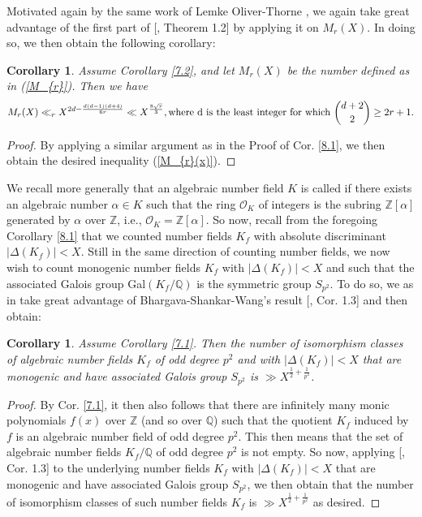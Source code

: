 \documentclass{article}
\theoremstyle{plain}
\newtheorem{cor}[thm]{Corollary}
\theoremstyle{definition}
\begin{document}
Motivated again by the same work of Lemke Oliver-Thorne \cite{lem}, we again take great advantage of the first part of [\cite{lem}, Theorem 1.2] by applying it on $M_{r}(X)$. In doing so, we then obtain the following corollary:

\begin{cor}Assume Corollary \ref{7.2}, and let $M_{r}(X)$ be the number defined as in \textnormal{(\ref{M_{r}})}. Then we have 
\begin{equation}\label{M_{r}(x)}
M_{r}(X)\ll_{r}X^{2d - \frac{d(d-1)(d+4)}{6r}}\ll X^{\frac{8\sqrt{r}}{3}}, \text{where d is the least integer for which } \binom{d+2}{2}\geq 2r + 1.
\end{equation}
\end{cor}

\begin{proof}
By applying a similar argument as in the Proof of Cor. \ref{8.1}, we then obtain the desired inequality \textnormal{(\ref{M_{r}(x)})}.
\end{proof}

We recall more generally that an algebraic number field $K$ is called  if there exists an algebraic number $\alpha \in K$ such that the ring $\mathcal{O}_{K}$ of integers is the subring $\mathbb{Z}[\alpha]$ generated by $\alpha$ over $\mathbb{Z}$, i.e., $\mathcal{O}_{K}= \mathbb{Z}[\alpha]$. So now, recall from the foregoing Corollary \ref{8.1} that we counted number fields $K_{f}$ with absolute discriminant $|\Delta(K_{f})| < X$. Still in the same direction of counting number fields, we now wish to count monogenic number fields $K_{f}$ with $|\Delta(K_{f})| < X$ and such that the associated Galois group Gal$(K_{f}\slash \mathbb{Q})$ is the symmetric group $S_{p^2}$. To do so, we as in \cite{BK1} take great advantage of Bhargava-Shankar-Wang's result [\cite{sch1}, Cor. 1.3] and then obtain:

\begin{cor}\label{8.3}
Assume Corollary \ref{7.1}. Then the number of isomorphism classes of algebraic number fields $K_{f}$ of odd degree $p^2$ and with $|\Delta(K_{f})| < X$ that are monogenic and have associated Galois group $S_{p^2}$ is $\gg X^{\frac{1}{2} + \frac{1}{p^2}}$.
\end{cor}

\begin{proof}
By Cor. \ref{7.1}, it then also follows that there are infinitely many monic polynomials $f(x)$ over $\mathbb{Z}$ (and so over $\mathbb{Q}$) such that the quotient $K_{f}$ induced by $f$ is an algebraic number field of odd degree $p^2$. This then means that the set of algebraic number fields $K_{f}\slash \mathbb{Q}$ of odd degree $p^2$ is not empty. So now, applying [\cite{sch1}, Cor. 1.3] to the underlying number fields $K_{f}$ with $|\Delta(K_{f})| < X$ that are monogenic and have associated Galois group $S_{p^2}$, we then obtain that the number of isomorphism classes of such number fields $K_{f}$ is $\gg X^{\frac{1}{2} + \frac{1}{p^2}}$ as desired.
\end{proof}
\end{document}
